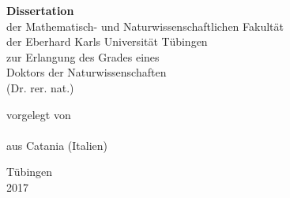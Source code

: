 \begin{titlepage}
{

\makeatletter
\centering
\linespread{1.5}\selectfont
\parskip 0pt

\vspace*{-2cm}

{\huge \bfseries
  \@title\par}

\vspace{4cm}
\large

{\bfseries Dissertation}\\
%
%
der Mathematisch- und Naturwissenschaftlichen Fakult\"at\\
der Eberhard Karls Universit\"at T\"ubingen\\
zur Erlangung des Grades eines\\
Doktors der Naturwissenschaften\\
(Dr. rer. nat.)

\vspace{4 cm}

vorgelegt von \\
\@author \\
aus Catania (Italien)

\vspace{2 cm}

T\"ubingen\\
2017

\vfill
\makeatother
}
\end{titlepage}
